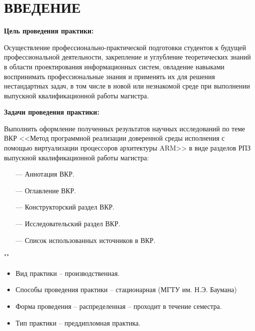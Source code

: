 \section*{ВВЕДЕНИЕ}

\textbf{Цель проведения практики:}

Осуществление профессионально-практической подготовки студентов к будущей профессиональной деятельности, закрепление и углубление теоретических знаний в области проектирования информационных систем, овладение навыками воспринимать профессиональные знания и применять их для решения нестандартных задач, в том числе в новой или незнакомой среде при выполнении выпускной квалификационной работы магистра.

\textbf{Задачи проведения практики:}

Выполнить оформление полученных результатов научных исследований по теме ВКР <<Метод программной реализации доверенной среды исполнения с помощью виртуализации процессоров архитектуры ARM>>  в виде разделов РПЗ  выпускной квалификационной работы магистра:

\begin{itemize}
	\item [---] Аннотация ВКР.
	\item [---] Оглавление ВКР.
	\item [---] Конструкторский раздел ВКР.
	\item [---] Исследовательский раздел ВКР.
	\item [---] Список использованных источников в ВКР.
\end{itemize}

""

\begin{itemize}
\item Вид практики – производственная.
\item Способы проведения практики – стационарная (МГТУ им. Н.Э. Баумана)
\item Форма проведения – распределенная – проходит в течение семестра.
\item Тип практики – преддипломная практика.
\end{itemize}

\pagebreak
